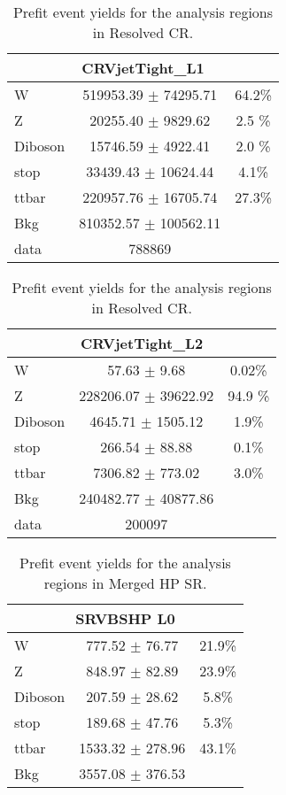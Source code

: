 \begin{table}
\caption{Prefit event yields for the analysis regions in Resolved \Wjets CR.}
\label{tab:PrefitYield_WCRRes_Per}
\begin{center}
\begin{tabular}{|l|c|c|}
\hline
\multicolumn{3}{|c|}{CRVjetTight\_L1}\\ \hline
W & 519953.39 $\pm$ 74295.71 & 64.2\%\\
Z & 20255.40 $\pm$ 9829.62 & 2.5 \% \\
Diboson & 15746.59 $\pm$ 4922.41 & 2.0 \% \\
stop & 33439.43 $\pm$ 10624.44 & 4.1\% \\
ttbar & 220957.76 $\pm$ 16705.74 & 27.3\% \\
\hline
Bkg & 810352.57 $\pm$ 100562.11 & \\
\hline
data & 788869 & \\ \hline
\end{tabular}
\end{center}
\end{table}


\begin{table}
\caption{Prefit event yields for the analysis regions in Resolved \Zjets CR.}
\label{tab:PrefitYield_ZCRRes_Per}
\begin{center}
\begin{tabular}{|l|c|c|}
\hline
\multicolumn{3}{|c|}{CRVjetTight\_L2}\\ \hline
W & 57.63 $\pm$ 9.68 & 0.02\%\\
Z & 228206.07 $\pm$ 39622.92 & 94.9 \%  \\
Diboson & 4645.71 $\pm$ 1505.12 & 1.9\% \\
stop & 266.54 $\pm$ 88.88 & 0.1\% \\
ttbar & 7306.82 $\pm$ 773.02 & 3.0\%\\
\hline
Bkg & 240482.77 $\pm$ 40877.86 & \\
\hline
data & 200097 & \\ \hline
\end{tabular}
\end{center}
\end{table}

\clearpage 
\begin{table} [h]
\caption{Prefit event yields for the analysis regions in \zlep Merged HP SR.}
\label{tab:PrefitYield_0lepHPSR_Per}
\begin{center}
\begin{tabular}{|l|c|c|}
\hline
\multicolumn{3}{|c|}{SRVBSHP L0}\\ \hline
W & 777.52 $\pm$ 76.77 & 21.9\% \\
Z & 848.97 $\pm$ 82.89 & 23.9\% \\
Diboson & 207.59 $\pm$ 28.62 & 5.8\% \\
stop & 189.68 $\pm$ 47.76 & 5.3\% \\
ttbar & 1533.32 $\pm$ 278.96 & 43.1\% \\
\hline
Bkg & 3557.08 $\pm$ 376.53 & \\
\hline
\end{tabular}
\end{center}
\end{table}

